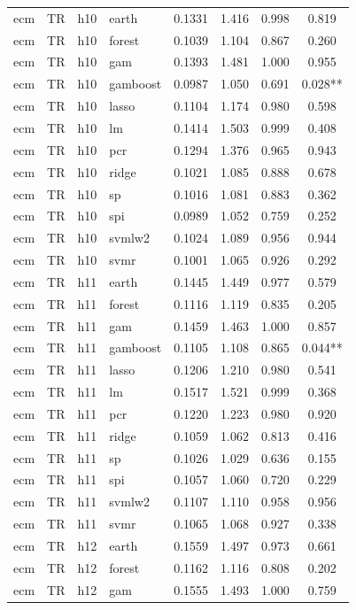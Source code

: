 \begin{ThreePartTable}
\begin{longtable}[t]{llclcccc}
\addlinespace
ecm & TR & h10 & earth & 0.1331 & 1.416 & 0.998 & 0.819\\
ecm & TR & h10 & forest & 0.1039 & 1.104 & 0.867 & 0.260\\
ecm & TR & h10 & gam & 0.1393 & 1.481 & 1.000 & 0.955\\
ecm & TR & h10 & gamboost & 0.0987 & 1.050 & 0.691 & 0.028**\\
ecm & TR & h10 & lasso & 0.1104 & 1.174 & 0.980 & 0.598\\
ecm & TR & h10 & lm & 0.1414 & 1.503 & 0.999 & 0.408\\
ecm & TR & h10 & pcr & 0.1294 & 1.376 & 0.965 & 0.943\\
ecm & TR & h10 & ridge & 0.1021 & 1.085 & 0.888 & 0.678\\
ecm & TR & h10 & sp & 0.1016 & 1.081 & 0.883 & 0.362\\
ecm & TR & h10 & spi & 0.0989 & 1.052 & 0.759 & 0.252\\
ecm & TR & h10 & svmlw2 & 0.1024 & 1.089 & 0.956 & 0.944\\
ecm & TR & h10 & svmr & 0.1001 & 1.065 & 0.926 & 0.292\\
\addlinespace
ecm & TR & h11 & earth & 0.1445 & 1.449 & 0.977 & 0.579\\
ecm & TR & h11 & forest & 0.1116 & 1.119 & 0.835 & 0.205\\
ecm & TR & h11 & gam & 0.1459 & 1.463 & 1.000 & 0.857\\
ecm & TR & h11 & gamboost & 0.1105 & 1.108 & 0.865 & 0.044**\\
ecm & TR & h11 & lasso & 0.1206 & 1.210 & 0.980 & 0.541\\
ecm & TR & h11 & lm & 0.1517 & 1.521 & 0.999 & 0.368\\
ecm & TR & h11 & pcr & 0.1220 & 1.223 & 0.980 & 0.920\\
ecm & TR & h11 & ridge & 0.1059 & 1.062 & 0.813 & 0.416\\
ecm & TR & h11 & sp & 0.1026 & 1.029 & 0.636 & 0.155\\
ecm & TR & h11 & spi & 0.1057 & 1.060 & 0.720 & 0.229\\
ecm & TR & h11 & svmlw2 & 0.1107 & 1.110 & 0.958 & 0.956\\
ecm & TR & h11 & svmr & 0.1065 & 1.068 & 0.927 & 0.338\\
\addlinespace
ecm & TR & h12 & earth & 0.1559 & 1.497 & 0.973 & 0.661\\
ecm & TR & h12 & forest & 0.1162 & 1.116 & 0.808 & 0.202\\
ecm & TR & h12 & gam & 0.1555 & 1.493 & 1.000 & 0.759\\

\end{longtable}
\end{ThreePartTable}
